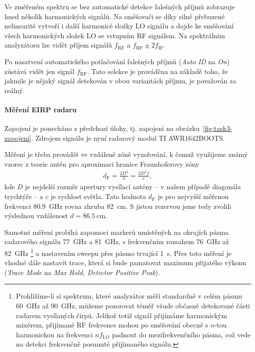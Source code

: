 \documentclass[11pt,a4paper]{article}
\begin{document}
Ve změřeném spektru se bez automatické detekce falešných příjmů zobrazuje hned několik harmonických signálů. Na směšovači se díky silně přebuzené nelinearitě vytvoří i další harmonicé složky LO signálu a dojde ke směšování všech harmonických složek LO se vstupním RF signálem. Na spektrálním analyzátoru lze vidět příjem signálů $f_{\mathrm{RF}}$ a $f_{\mathrm{RF}}\pm2f_{\mathrm{IF}}$.

Po nasatvení automatického potlačování falešných příjmů (\emph{Auto ID} na \emph{On}) zůstává vidět jen signál $f_{\mathrm{RF}}$. Tato selekce je prováděna na základě toho, že jakmile je nějaký signál detekován v obou variantách příjmu, je považován za reálný.

\paragraph*{Měření EIRP radaru} Zapojení je ponecháno z předchozí úlohy, tj. zapojení na obrázku~\ref{fig:task3-zapojeni}. Zdrojem signálu je nyní radarový modul TI AWR1642BOOTS.

Měření je třeba provádět ve vzdálené zóně vyzařování, k čemuž využijeme známý vzorec z teorie antén pro aproximaci hranice Fraunhoferovy zóny
\begin{align}
    \label{eq:farfield}
    d_{\mathrm F} = \frac{2D^2}{\lambda} = \frac{2D^2f}{c},
\end{align}
kde $D$ je nejdelší rozměr apertury vysílací antény -- v našem případě diagonála trychtýře -- a $c$ je rychlost světla. Tato hodnota $d_{\mathrm F}$ je pro nejvyšší měřenou frekvenci 80.9~GHz rovna zhruba 82~cm. S jistou rezervou jsme tedy zvolili výslednou vzdálenost $d = 86.5\ \mathrm{cm}$.

Samotné měření probíhá zapomoci markerů umístěných na okrajích pásma radarového signálu 77~GHz a 81~GHz, s frekvenčním rozsahem 76~GHz až 82~GHz%
    \footnote{Prohlížíme-li si spektrum, které analyzátor měří standardně v celém pásmu 60~GHz až 90~GHz, můžeme pozorovat téměř všude občasně detekované části radarem vysílaných čirpů. Jelikož totiž signál přijímáme harmonickým mixérem, přijímané RF frekvence mohou po směšování obecně s $n$-tou harmonickou na frekvenci $nf_{\mathrm{LO}}$ padnout do mezifrekvenčního pásma, což vede na detekci frekvenčně posunuté  přijímaného signálu.}
a nastavením sweepu přes pásmo trvající 1~s. Přes toto měření je vhodné dále nastavit trace, která si bude pamatovat maximum přijatého výkonu (\emph{Trace Mode} na \emph{Max Hold, Detector Positive Peak}).
\end{document}
